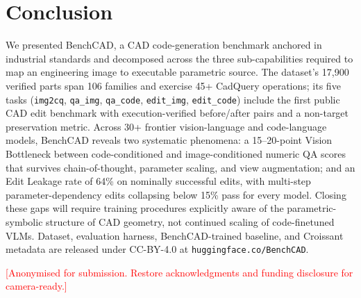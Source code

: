 \documentclass{article}
\begin{document}
\section{Conclusion}
\label{sec:conclusion}

We presented BenchCAD, a CAD code-generation benchmark anchored in industrial standards and decomposed across the three sub-capabilities required to map an engineering image to executable parametric source. The dataset's 17{,}900 verified parts span 106 families and exercise 45+ CadQuery operations; its five tasks (\texttt{img2cq}, \texttt{qa\_img}, \texttt{qa\_code}, \texttt{edit\_img}, \texttt{edit\_code}) include the first public CAD edit benchmark with execution-verified before/after pairs and a non-target preservation metric. Across 30+ frontier vision-language and code-language models, BenchCAD reveals two systematic phenomena: a 15--20-point Vision Bottleneck between code-conditioned and image-conditioned numeric QA scores that survives chain-of-thought, parameter scaling, and view augmentation; and an Edit Leakage rate of 64\% on nominally successful edits, with multi-step parameter-dependency edits collapsing below 15\% pass for every model. Closing these gaps will require training procedures explicitly aware of the parametric-symbolic structure of CAD geometry, not continued scaling of code-finetuned VLMs. Dataset, evaluation harness, BenchCAD-trained baseline, and Croissant metadata are released under CC-BY-4.0 at \texttt{huggingface.co/BenchCAD}.


\begin{ack}
\textcolor{red}{[Anonymised for submission. Restore acknowledgments and funding disclosure for camera-ready.]}
\end{ack}
\end{document}
